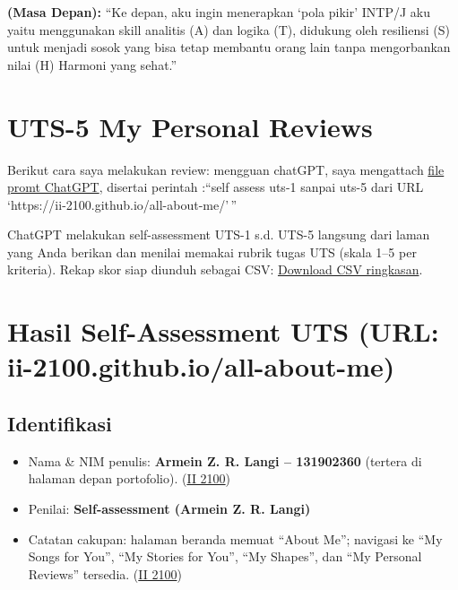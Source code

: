 \documentclass[
  letterpaper,
  DIV=11,
  numbers=noendperiod]{scrreprt}
\providecommand{\tightlist}{%
  \setlength{\itemsep}{0pt}\setlength{\parskip}{0pt}}
\begin{document}
\textbf{(Masa Depan):} ``Ke depan, aku ingin menerapkan `pola pikir'
INTP/J aku yaitu menggunakan skill analitis (A) dan logika (T), didukung
oleh resiliensi (S) untuk menjadi sosok yang bisa tetap membantu orang
lain tanpa mengorbankan nilai (H) Harmoni yang sehat.''


\chapter{UTS-5 My Personal Reviews}\label{uts-5-my-personal-reviews}

Berikut cara saya melakukan review: mengguan chatGPT, saya mengattach
\href{skor_uts.pdf}{file promt ChatGPT}, disertai perintah :``self
assess uts-1 sanpai uts-5 dari URL
`https://ii-2100.github.io/all-about-me/'\,''

ChatGPT melakukan self-assessment UTS-1 s.d. UTS-5 langsung dari laman
yang Anda berikan dan menilai memakai rubrik tugas UTS (skala 1--5 per
kriteria). Rekap skor siap diunduh sebagai CSV:
\href{sandbox:/mnt/data/UTS_self_assessment.csv}{Download CSV
ringkasan}.


\chapter{Hasil Self-Assessment UTS (URL:
ii-2100.github.io/all-about-me)}\label{hasil-self-assessment-uts-url-ii-2100.github.ioall-about-me}

\section{Identifikasi}\label{identifikasi}

\begin{itemize}
\tightlist
\item
  Nama \& NIM penulis: \textbf{Armein Z. R. Langi -- 131902360} (tertera
  di halaman depan portofolio).
  (\href{https://ii-2100.github.io/all-about-me/}{II 2100})
\item
  Penilai: \textbf{Self-assessment (Armein Z. R. Langi)}
\item
  Catatan cakupan: halaman beranda memuat ``About Me''; navigasi ke ``My
  Songs for You'', ``My Stories for You'', ``My Shapes'', dan ``My
  Personal Reviews'' tersedia.
  (\href{https://ii-2100.github.io/all-about-me/}{II 2100})
\end{itemize}
\end{document}
